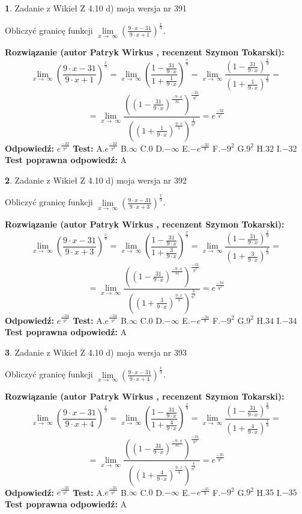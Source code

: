 \documentclass[12pt, a4paper]{article}
\theoremstyle{definition} %
\newtheorem{zad}{}
\newcommand{\zadStart}[1]{\begin{zad}#1\newline}
\newcommand{\zadStop}{\end{zad}}
\newcommand{\rozwStart}[2]{\noindent \textbf{Rozwiązanie (autor #1 , recenzent #2): }\newline}
\newcommand{\rozwStop}{\newline}
\newcommand{\odpStart}{\noindent \textbf{Odpowiedź:}\newline}
\newcommand{\odpStop}{\newline}
\newcommand{\testStart}{\noindent \textbf{Test:}\newline}
\newcommand{\testStop}{\newline}
\newcommand{\kluczStart}{\noindent \textbf{Test poprawna odpowiedź:}\newline}
\newcommand{\kluczStop}{\newline}
\begin{document}
\zadStart{Zadanie z Wikieł Z 4.10 d) moja wersja nr 391}


Obliczyć granicę funkcji  $\lim\limits_{x\to\ \infty}(\frac{9\cdot x-31}{9\cdot x+1})^{\frac{x}{9}}$.
\zadStop
\rozwStart{Patryk Wirkus}{Szymon Tokarski}
$$\lim\limits_{x\to\ \infty}(\frac{9\cdot x-31}{9\cdot x+1})^{\frac{x}{9}} = \lim\limits_{x\to\ \infty}(\frac{1-\frac{31}{9\cdot x}}{1+\frac{1}{9\cdot x}})^{\frac{x}{9}}=\lim\limits_{x\to\ \infty}\frac{(1-\frac{31}{9\cdot x})^{\frac{x}{9}}}{(1+\frac{1}{9\cdot x})^{\frac{x}{9}}}=$$
$$=\lim\limits_{x\to\ \infty}\frac{((1-\frac{31}{9\cdot x})^{\frac{-9\cdot x}{31}})^{\frac{-31}{9^{2}}}}{((1+\frac{1}{9\cdot x})^{\frac{9\cdot x}{1}})^{\frac{1}{9^{2}}}}=e^{\frac{-32}{9^{2}}}$$
\rozwStop
\odpStart
$e^{\frac{-32}{9^{2}}}$
\odpStop
\testStart
A.$e^{\frac{-32}{9^{2}}}$ B.$\infty$ C.$0$ D.$-\infty$ E.$-e^{\frac{-32}{9}}$
F.$-9^{2}$ G.$9^{2}$
H.$32$
I.$-32$
\testStop
\kluczStart
A
\kluczStop



\zadStart{Zadanie z Wikieł Z 4.10 d) moja wersja nr 392}


Obliczyć granicę funkcji  $\lim\limits_{x\to\ \infty}(\frac{9\cdot x-31}{9\cdot x+3})^{\frac{x}{9}}$.
\zadStop
\rozwStart{Patryk Wirkus}{Szymon Tokarski}
$$\lim\limits_{x\to\ \infty}(\frac{9\cdot x-31}{9\cdot x+3})^{\frac{x}{9}} = \lim\limits_{x\to\ \infty}(\frac{1-\frac{31}{9\cdot x}}{1+\frac{3}{9\cdot x}})^{\frac{x}{9}}=\lim\limits_{x\to\ \infty}\frac{(1-\frac{31}{9\cdot x})^{\frac{x}{9}}}{(1+\frac{3}{9\cdot x})^{\frac{x}{9}}}=$$
$$=\lim\limits_{x\to\ \infty}\frac{((1-\frac{31}{9\cdot x})^{\frac{-9\cdot x}{31}})^{\frac{-31}{9^{2}}}}{((1+\frac{3}{9\cdot x})^{\frac{9\cdot x}{3}})^{\frac{3}{9^{2}}}}=e^{\frac{-34}{9^{2}}}$$
\rozwStop
\odpStart
$e^{\frac{-34}{9^{2}}}$
\odpStop
\testStart
A.$e^{\frac{-34}{9^{2}}}$ B.$\infty$ C.$0$ D.$-\infty$ E.$-e^{\frac{-34}{9}}$
F.$-9^{2}$ G.$9^{2}$
H.$34$
I.$-34$
\testStop
\kluczStart
A
\kluczStop



\zadStart{Zadanie z Wikieł Z 4.10 d) moja wersja nr 393}


Obliczyć granicę funkcji  $\lim\limits_{x\to\ \infty}(\frac{9\cdot x-31}{9\cdot x+4})^{\frac{x}{9}}$.
\zadStop
\rozwStart{Patryk Wirkus}{Szymon Tokarski}
$$\lim\limits_{x\to\ \infty}(\frac{9\cdot x-31}{9\cdot x+4})^{\frac{x}{9}} = \lim\limits_{x\to\ \infty}(\frac{1-\frac{31}{9\cdot x}}{1+\frac{4}{9\cdot x}})^{\frac{x}{9}}=\lim\limits_{x\to\ \infty}\frac{(1-\frac{31}{9\cdot x})^{\frac{x}{9}}}{(1+\frac{4}{9\cdot x})^{\frac{x}{9}}}=$$
$$=\lim\limits_{x\to\ \infty}\frac{((1-\frac{31}{9\cdot x})^{\frac{-9\cdot x}{31}})^{\frac{-31}{9^{2}}}}{((1+\frac{4}{9\cdot x})^{\frac{9\cdot x}{4}})^{\frac{4}{9^{2}}}}=e^{\frac{-35}{9^{2}}}$$
\rozwStop
\odpStart
$e^{\frac{-35}{9^{2}}}$
\odpStop
\testStart
A.$e^{\frac{-35}{9^{2}}}$ B.$\infty$ C.$0$ D.$-\infty$ E.$-e^{\frac{-35}{9}}$
F.$-9^{2}$ G.$9^{2}$
H.$35$
I.$-35$
\testStop
\kluczStart
A
\kluczStop
\end{document}
